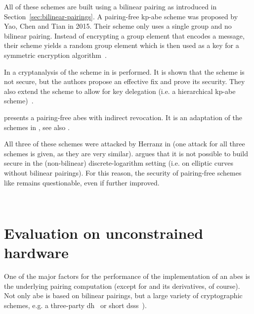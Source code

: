 All of these schemes are built using a bilinear pairing as introduced in Section~\ref{sec:bilinear-pairings}.
A pairing-free \acrshort{kp-abe} scheme was proposed by Yao, Chen and Tian \cite{yao_lightweight_2015} in 2015.
Their scheme only uses a single group and no bilinear pairing.
Instead of encrypting a group element that encodes a message, their scheme yields a random group element which is then used as a key for a symmetric encryption algorithm~\cite{yao_lightweight_2015}.

In \cite{tan_enhancement_2019} a cryptanalysis of the scheme in \cite{yao_lightweight_2015} is performed.
It is shown that the scheme is not secure, but the authors propose an effective fix and prove its security.
They also extend the scheme to allow for key delegation (i.e. a hierarchical \acrshort{kp-abe} scheme)~\cite{tan_enhancement_2019}.

\cite{sowjanya_efficient_2020} presents a pairing-free \acrshort{abes} with indirect revocation.
It is an adaptation of the schemes in \cite{yao_lightweight_2015,tan_enhancement_2019}, see also \cite{herranz_attacking_2020}.

All three of these schemes were attacked by Herranz in \cite{herranz_attacking_2020} (one attack for all three schemes is given, as they are very similar).
\cite{herranz_attacking_2020} argues that it is not possible to build secure  in the (non-bilinear) discrete-logarithm setting (i.e. on elliptic curves without bilinear pairings).
For this reason, the security of pairing-free schemes like \cite{yao_lightweight_2015,sowjanya_efficient_2020,tan_enhancement_2019} remains questionable, even if further improved.

~

\section{Evaluation on unconstrained hardware}
One of the major factors for the performance of the implementation of an \acrshort{abes} is the underlying pairing computation (except for \cite{yao_lightweight_2015} and its derivatives, of course).
Not only \acrshort{abe} is based on bilinear pairings, but a large variety of cryptographic schemes, e.g. a three-party \gls{dh}~\cite{joux_one_2000} or short \glspl{dss}~\cite{boneh_short_2001}).

